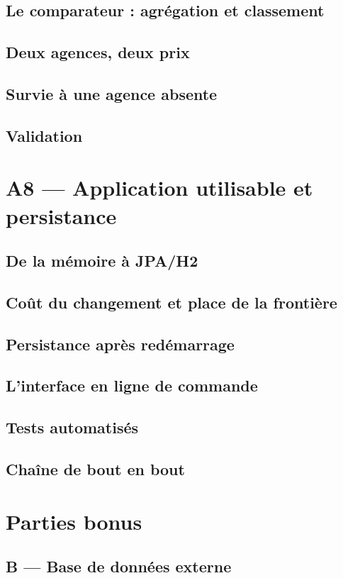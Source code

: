 \documentclass[11pt,a4paper]{report}
\begin{document}
\section{Le comparateur : agrégation et classement}
\section{Deux agences, deux prix}
\section{Survie à une agence absente}
\section{Validation}

\chapter{A8 --- Application utilisable et persistance}
\section{De la mémoire à JPA/H2}
\section{Coût du changement et place de la frontière}
\section{Persistance après redémarrage}
\section{L'interface en ligne de commande}
\section{Tests automatisés}
\section{Chaîne de bout en bout}

\chapter{Parties bonus}
\section{B --- Base de données externe}
\end{document}
